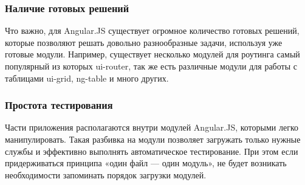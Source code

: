 \subsubsection*{Наличие готовых решений}
Что важно, для Angular.JS существует огромное количество готовых решений, которые
позволяют решать довольно разнообразные задачи, используя уже готовые модули.
Например, существует несколько модулей для роутинга самый популярный из которых
ui-router, так же есть различные модули для работы с таблицами ui-grid, ng-table
и много других.
\subsubsection*{Простота тестирования}
Части приложения располагаются внутри модулей Angular.JS, которыми легко манипулировать.
Такая разбивка на модули позволяет загружать только нужные службы и эффективно выполнять
автоматическое тестирование. При этом если придерживаться принципа «один файл — один модуль»,
не будет возникать необходимости запоминать порядок загрузки модулей.
